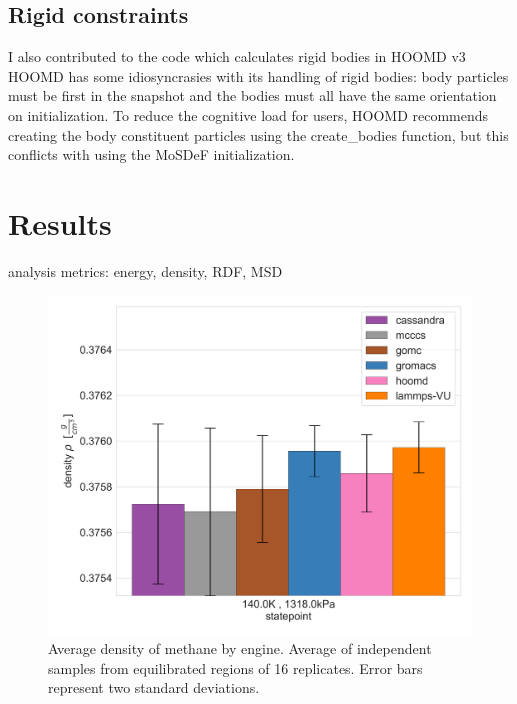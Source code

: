 \subsection{Rigid constraints}

I also contributed to the code which calculates rigid bodies in HOOMD v3 %
HOOMD has some idiosyncrasies with its handling of rigid bodies: body particles must be first in the snapshot and the bodies must all have the same orientation on initialization. To reduce the cognitive load for users, HOOMD recommends creating the body constituent particles using the create\_bodies function, but this conflicts with using the MoSDeF initialization.

\section{Results} 

analysis metrics: energy, density, RDF, MSD

\begin{figure}[h!]
    \centering
    \includegraphics[width=0.8\linewidth,keepaspectratio]{figures/rep_study/methaneUA_summary.png}
    \caption{Average density of methane by engine. Average of independent samples from equilibrated regions of 16 replicates. Error bars represent two standard deviations.}\label{fig:methane_density}
\end{figure}


